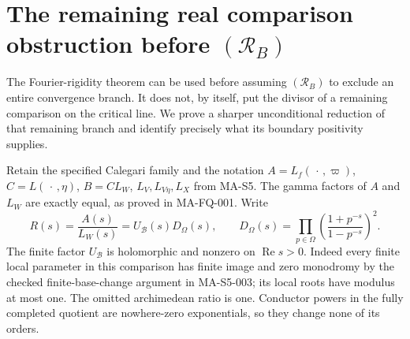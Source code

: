 \section{The remaining real comparison obstruction before \texorpdfstring{\((\mathcal R_B)\)}{the real-zero hypothesis}}
\label{sec:s5-abscissa-reduction}

The Fourier-rigidity theorem can be used before assuming
\((\mathcal R_B)\) to exclude an entire convergence branch.
It does not, by itself, put the divisor of a remaining comparison
on the critical line.  We prove a sharper unconditional reduction
of that remaining branch and identify precisely what its boundary
positivity supplies.

Retain the specified Calegari family and the notation
\(A=L_f(\,\cdot\,,\varpi)\), \(C=L(\,\cdot\,,\eta)\),
\(B=C L_W\), \(L_V,L_{V\eta},L_X\) from MA-S5.
The gamma factors of \(A\) and \(L_W\) are exactly equal,
as proved in MA-FQ-001.  Write
\[
 R(s)=\frac{A(s)}{L_W(s)}
       =U_{\mathcal B}(s)D_\Omega(s),\qquad
 D_\Omega(s)=\prod_{p\in\Omega}
                  \left(\frac{1+p^{-s}}{1-p^{-s}}\right)^2 .
 \tag{MA-RB.17}
\]
The finite factor \(U_{\mathcal B}\) is holomorphic and nonzero
on \(\operatorname{Re}s>0\).  Indeed every finite local parameter
in this comparison has finite image and zero monodromy by
the checked finite-base-change argument in MA-S5-003;
its local roots have modulus at most one.
The omitted archimedean ratio is one.
Conductor powers in the fully completed quotient are
nowhere-zero exponentials, so they change none of its orders.

